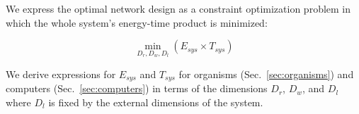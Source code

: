 \documentclass[12pt]{article}
\begin{document}

We express the optimal network design as a constraint optimization 
problem in which the whole system's energy-time product is minimized:

\begin{equation}
  \min_{D_r,D_w,D_l}(E_{sys} \times T_{sys})
\label{eq:TheWholeEnchilada}
\end{equation}


We derive expressions for $E_{sys}$ and $T_{sys}$ for organisms
(Sec.~\ref{sec:organisms}) and computers (Sec.~\ref{sec:computers}) in
terms of the dimensions $D_r$, $D_w$, and $D_l$ where $D_l$ is fixed by the external dimensions of the system.




\end{document}

